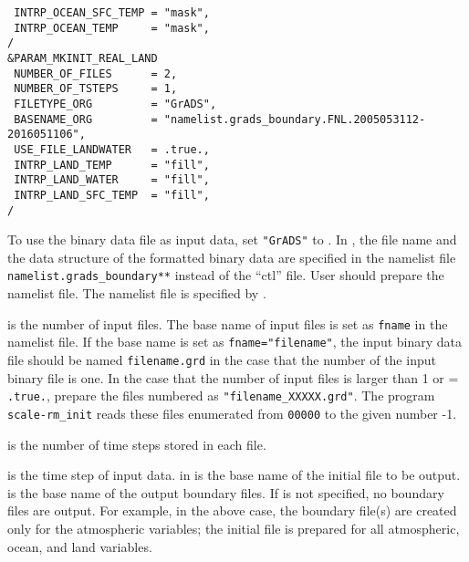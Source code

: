 {\verb| INTRP_OCEAN_SFC_TEMP = "mask",|\\
\verb| INTRP_OCEAN_TEMP     = "mask",|\\
\verb|/|\\
\verb|&PARAM_MKINIT_REAL_LAND|\\
\verb| NUMBER_OF_FILES      = 2,|\\
\verb| NUMBER_OF_TSTEPS     = 1, |\\
\verb| FILETYPE_ORG         = "GrADS",|\\
\verb| BASENAME_ORG         = "namelist.grads_boundary.FNL.2005053112-2016051106",|\\
\verb| USE_FILE_LANDWATER   = .true.,|\\
\verb| INTRP_LAND_TEMP      = "fill",|\\
\verb| INTRP_LAND_WATER     = "fill",|\\
\verb| INTRP_LAND_SFC_TEMP  = "fill",|\\
\verb|/|\\
}

To use the binary data file as input data, set \verb|"GrADS"| to .
In \scalerm, the file name and the data structure of the \grads formatted binary data are specified in the namelist file \verb|namelist.grads_boundary**| instead of the ``ctl'' file.
User should prepare the namelist file.
The namelist file is specified by .

 is the number of input files.
The base name of input files is set as \verb|fname| in the namelist file.
If the base name is set as \verb|fname="filename"|, the input binary data file should be named  \verb|filename.grd| in the case that the number of the input binary file is one.
In the case that the number of input files is larger than 1 or  = \verb|.true.|, prepare the files numbered as \verb|"filename_XXXXX.grd"|.
The program \verb|scale-rm_init| reads these files enumerated from \verb|00000| to the given number -1.

 is the number of time steps stored in each file.


 is the time step of input data.
 in  is the base name of the initial file to be output.
 is the base name of the output boundary files.
If  is not specified, no boundary files are output.
For example, in the above case, the boundary file(s) are created only for the atmospheric variables; the initial file is prepared for all atmospheric, ocean, and land variables.

